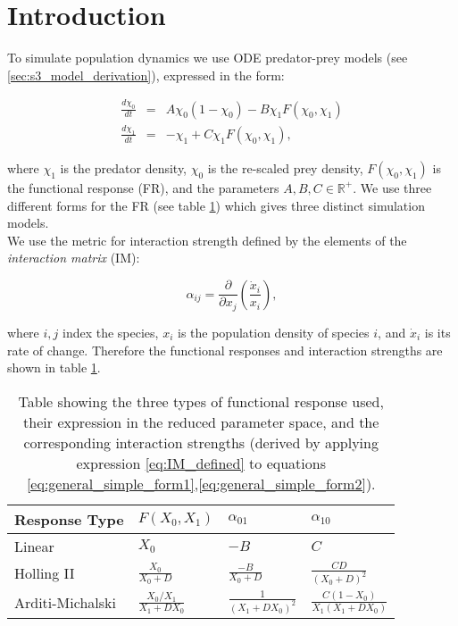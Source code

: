 \documentclass[a4paper,12pt]{article}
\begin{document}
\section{Introduction}

To simulate population dynamics we use ODE predator-prey models (see \ref{sec:s3_model_derivation}), expressed in the form: 

\begin{eqnarray}
\frac{d\chi_{0}}{dt} &=& A\chi_0(1-\chi_0) - B\chi_1F(\chi_0,\chi_1) \label{eq:general_simple_form1} \\
\frac{d\chi_{1}}{dt} &=& -\chi_1 + C\chi_1F(\chi_0,\chi_1) \label{eq:general_simple_form2}, 
\end{eqnarray}

where $\chi_1$ is the predator density, $\chi_0$ is the re-scaled prey density, $F(\chi_0,\chi_1)$ is the functional response (FR), and the parameters $A,B,C \in \mathbb{R}^+$. We use three different forms for the FR (see table \ref{table:response_interaction_table}) which gives three distinct simulation models.
\\
We use the metric for interaction strength defined by the elements of the \emph{interaction matrix} (IM):

\begin{equation}
\label{eq:IM_defined}
\alpha_{ij} = \frac{\partial}{\partial x_{j}}(\frac{\dot{x}_{i}}{x_{i}}),
\end{equation}  

where $i,j$ index the species, $x_i$ is the population density of species $i$, and $\dot{x}_i$ is its rate of change. Therefore the functional responses and interaction strengths are shown in table \ref{table:response_interaction_table}.

\begin{center}
\begin{table}[hb!]

    \begin{tabular}{| l | l | l | l |}

    \hline
    Response Type & $F(X_0,X_1)$ & $\alpha_{01}$ & $\alpha_{10}$ \\ \hline
    Linear & $X_0$ & $-B$ & $C$ \\ \hline
    Holling II & $\frac{X_0}{X_0 + D}$ & $\frac{-B}{X_0 + D} $ & $\frac{CD}{(X_0 + D)^2}$ \\ \hline
    Arditi-Michalski & $\frac{X_0/X_1}{X_1+DX_0}$ & $\frac{1}{(X_1+DX_0)^2}$ & $\frac{C(1-X_0)}{X_1(X_1+DX_0)}$ \\
    \hline
    \end{tabular}
    
\caption{Table showing the three types of functional response used, their expression in the reduced parameter space, and the corresponding interaction strengths (derived by applying expression \ref{eq:IM_defined} to equations \ref{eq:general_simple_form1},\ref{eq:general_simple_form2}).}
\label{table:response_interaction_table}    
\end{table}
\end{center}
\end{document}
